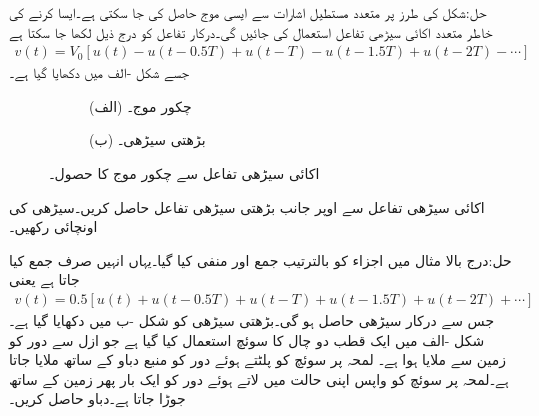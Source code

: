 حل:شکل  کی طرز پر متعدد مستطیل اشارات سے ایسی موج حاصل کی جا سکتی ہے۔ایسا کرنے کی خاطر متعدد اکائی سیڑھی تفاعل استعمال کی جائیں گی۔درکار تفاعل کو درج ذیل لکھا جا سکتا ہے
\begin{align*}
v(t)=V_0\left[u(t)-u(t-0.5T)+u(t-T)-u(t-1.5T)+u(t-2T)-\cdots\right]
\end{align*}
جسے شکل -الف میں دکھایا گیا ہے۔
\begin{figure}
\centering
\begin{subfigure}{0.5\textwidth}
\centering
{}
\caption*{(الف) چکور موج۔}
\end{subfigure}
\begin{subfigure}{0.5\textwidth}
\centering
{}
\caption*{(ب) بڑھتی سیڑھی۔}
\end{subfigure}
\caption{اکائی سیڑھی تفاعل سے چکور موج کا حصول۔}
\label{شکل_عارضی_اکائی_سے_چکور}
\end{figure}
اکائی سیڑھی تفاعل سے اوپر جانب بڑھتی سیڑھی تفاعل حاصل کریں۔سیڑھی کی اونچائی  رکھیں۔

حل:درج بالا مثال میں اجزاء کو بالترتیب جمع اور منفی کیا گیا۔یہاں انہیں صرف جمع کیا جاتا ہے یعنی
\begin{align*}
v(t)=0.5\left[u(t)+u(t-0.5T)+u(t-T)+u(t-1.5T)+u(t-2T)+\cdots\right]
\end{align*}
جس سے درکار سیڑھی حاصل ہو گی۔بڑھتی سیڑھی کو شکل -ب میں دکھایا گیا ہے۔   
شکل -الف میں ایک قطب دو چال کا سوئچ استعمال کیا گیا ہے جو ازل سے دور کو زمین سے ملایا ہوا ہے۔ لمحہ  پر سوئچ کو پلٹتے ہوئے دور کو منبع دباو کے ساتھ ملایا جاتا ہے۔لمحہ  پر سوئچ کو واپس اپنی حالت میں لاتے ہوئے دور کو ایک بار پھر زمین کے ساتھ جوڑا جاتا ہے۔دباو  حاصل کریں۔

